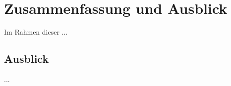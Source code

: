 \chapter{Zusammenfassung und Ausblick\label{ch_zusaus}}

Im Rahmen dieser ... 


\section*{Ausblick}


...
 
